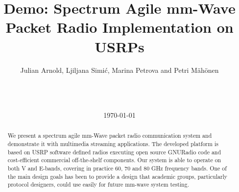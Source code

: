 \documentclass{acm_proc_article-sp}
\begin{document}
\title{Demo: Spectrum Agile mm-Wave Packet Radio Implementation on USRPs}
%
%
%
%
%

%
\author{
%
%
\alignauthor
Julian Arnold, Ljiljana Simi\'{c}, Marina Petrova and Petri M\"ah\"onen\\
       \\
       \\
       \\
}

\date{\today}

\maketitle
\begin{abstract}
We present a spectrum agile mm-Wave packet radio communication system and demonstrate it with multimedia streaming applications. The developed platform is based on USRP software defined radios executing open source GNURadio code and cost-efficient commercial off-the-shelf components. Our system is able to operate on both V and E-bands, covering in practice 60, 70 and 80 GHz frequency bands. One of the main design goals has been to provide a design that academic groups, particularly protocol designers, could use easily for future mm-wave system testing. 
\end{abstract}
\end{document}
